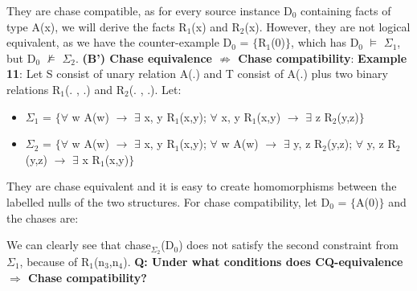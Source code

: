 \documentclass[11pt, a4paper, dvipsnames]{article}
\begin{document}
They are chase compatible, as for every source instance D$_{0}$ containing facts of type A(x), we will derive the facts R$_{1}$(x) and R$_{2}$(x). However, they are not logical equivalent, as we have the counter-example D$_{0}$ = $\{$R$_{1}$(0)$\}$, which has D$_{0}$ $\vDash$ $\Sigma_{1}$, but D$_{0}$ $\nvDash$ $\Sigma_{2}$.\newline
\textbf{(B') Chase equivalence $\nRightarrow$ Chase compatibility}:\newline
\textbf{Example 11}: Let S consist of unary relation A(.) and T consist of A(.) plus two binary relations R$_{1}$(. , .) and R$_{2}$(. , .). Let:
\begin{itemize}
	\item $\Sigma_{1}$ = $\{\forall$ w A(w) $\rightarrow$ $\exists$ x, y R$_{1}$(x,y); $\forall$ x, y R$_{1}$(x,y) $\rightarrow$ $\exists$ z R$_{2}$(y,z)$\}$
	\item $\Sigma_{2}$ = $\{\forall$ w A(w) $\rightarrow$ $\exists$ x, y R$_{1}$(x,y); $\forall$ w A(w) $\rightarrow$ $\exists$ y, z R$_{2}$(y,z); $\forall$ y, z R$_{2}$(y,z) $\rightarrow$ $\exists$ x R$_{1}$(x,y)$\}$
\end{itemize}
They are chase equivalent and it is easy to create homomorphisms between the labelled nulls of the two structures. For chase compatibility, let D$_{0}$ = $\{$A(0)$\}$ and the chases are:
\begin{center}
\end{center}
We can clearly see that chase$_{\Sigma_{2}}$(D$_{0}$) does not satisfy the second constraint from $\Sigma_{1}$, because of R$_{1}$(n$_{3}$,n$_{4}$).\newline
\textbf{Q: Under what conditions does CQ-equivalence $\Rightarrow$ Chase compatibility?}\newline
\end{document}
